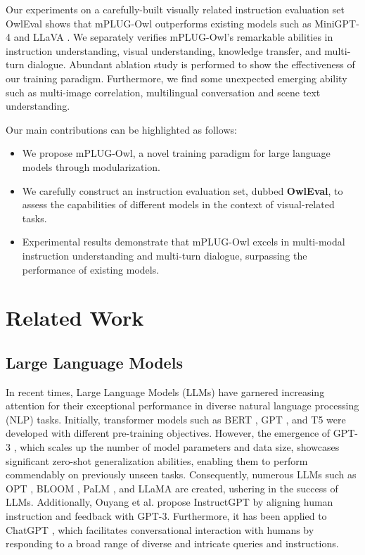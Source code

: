 \documentclass{article}
\newcommand{\modelname}{mPLUG-Owl\xspace}
\newcommand{\evalsetname}{OwlEval\xspace}
\begin{document}
Our experiments on a carefully-built visually related instruction evaluation set \evalsetname shows that \modelname outperforms existing models such as MiniGPT-4 \citep{minigpt4} and LLaVA \citep{llava}. We separately verifies 
\modelname's remarkable abilities in instruction understanding, visual understanding, knowledge transfer, and multi-turn dialogue. Abundant ablation study is performed to show the effectiveness of our training paradigm. Furthermore, we find some unexpected emerging ability such as multi-image correlation, multilingual conversation and scene text understanding.



Our main contributions can be highlighted as follows:
\begin{itemize}
    \item We propose \modelname, a novel  training paradigm for large language models through modularization.
    \item We carefully construct an instruction evaluation set, dubbed \textbf{OwlEval}, to assess the capabilities of different models in the context of visual-related tasks.
    \item Experimental results demonstrate that \modelname excels in multi-modal instruction understanding and multi-turn dialogue, surpassing the performance of existing models.
\end{itemize}

\section{Related Work}
\subsection{Large Language Models}
In recent times, Large Language Models (LLMs) have garnered increasing attention for their exceptional performance in diverse natural language processing (NLP) tasks. Initially, transformer models such as BERT \citep{bert}, GPT \citep{gpt1}, and T5 \citep{t5} were developed with different pre-training objectives. However, the emergence of GPT-3 \citep{gpt3}, which scales up the number of model parameters and data size, showcases significant zero-shot generalization abilities, enabling them to perform commendably on previously unseen tasks. Consequently, numerous LLMs such as OPT \citep{opt}, BLOOM \citep{bloom}, PaLM \citep{palm}, and LLaMA \citep{llama} are created, ushering in the success of LLMs. Additionally, Ouyang et al. \citep{instructgpt} propose InstructGPT by aligning human instruction and feedback with GPT-3. Furthermore, it has been applied to ChatGPT \citep{chatgpt}, which facilitates conversational interaction with humans by responding to a broad range of diverse and intricate queries and instructions.
\end{document}
